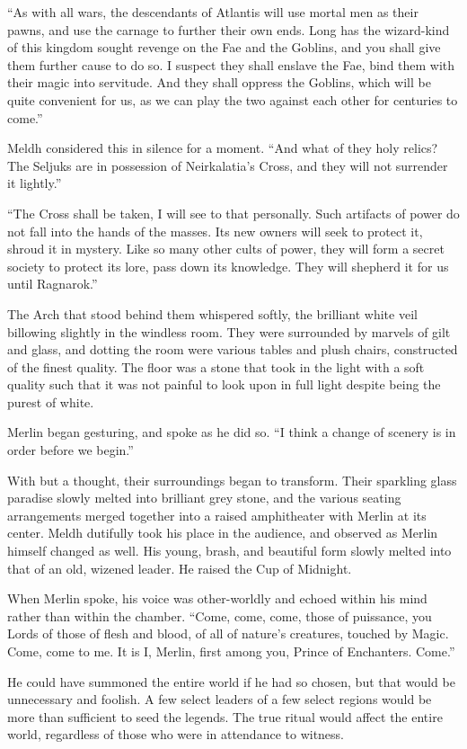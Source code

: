 “As with all wars, the descendants of Atlantis will use mortal men as their pawns, and use the carnage to further their own ends. Long has the wizard-kind of this kingdom sought revenge on the Fae and the Goblins, and you shall give them further cause to do so. I suspect they shall enslave the Fae, bind them with their magic into servitude. And they shall oppress the Goblins, which will be quite convenient for us, as we can play the two against each other for centuries to come.”

Meldh considered this in silence for a moment. “And what of they holy relics? The Seljuks are in possession of Neirkalatia’s Cross, and they will not surrender it lightly.”

“The Cross shall be taken, I will see to that personally. Such artifacts of power do not fall into the hands of the masses. Its new owners will seek to protect it, shroud it in mystery. Like so many other cults of power, they will form a secret society to protect its lore, pass down its knowledge. They will shepherd it for us until Ragnarok.”

The Arch that stood behind them whispered softly, the brilliant white veil billowing slightly in the windless room. They were surrounded by marvels of gilt and glass, and dotting the room were various tables and plush chairs, constructed of the finest quality. The floor was a stone that took in the light with a soft quality such that it was not painful to look upon in full light despite being the purest of white.

Merlin began gesturing, and spoke as he did so. “I think a change of scenery is in order before we begin.”

With but a thought, their surroundings began to transform. Their sparkling glass paradise slowly melted into brilliant grey stone, and the various seating arrangements merged together into a raised amphitheater with Merlin at its center. Meldh dutifully took his place in the audience, and observed as Merlin himself changed as well. His young, brash, and beautiful form slowly melted into that of an old, wizened leader. He raised the Cup of Midnight.

When Merlin spoke, his voice was other-worldly and echoed within his mind rather than within the chamber. “Come, come, come, those of puissance, you Lords of those of flesh and blood, of all of nature’s creatures, touched by Magic. Come, come to me. It is I, Merlin, first among you, Prince of Enchanters. Come.”

He could have summoned the entire world if he had so chosen, but that would be unnecessary and foolish. A few select leaders of a few select regions would be more than sufficient to seed the legends. The true ritual would affect the entire world, regardless of those who were in attendance to witness.

